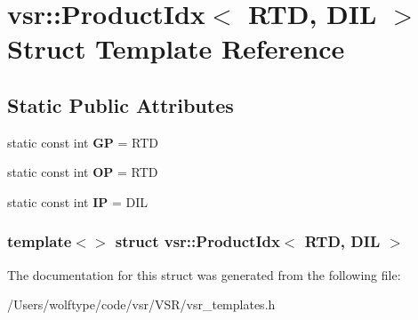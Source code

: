 \hypertarget{structvsr_1_1_product_idx_3_01_r_t_d_00_01_d_i_l_01_4}{\section{vsr\-:\-:Product\-Idx$<$ R\-T\-D, D\-I\-L $>$ Struct Template Reference}
\label{structvsr_1_1_product_idx_3_01_r_t_d_00_01_d_i_l_01_4}
}
\subsection*{Static Public Attributes}
\begin{DoxyCompactItemize}
\item 
\hypertarget{structvsr_1_1_product_idx_3_01_r_t_d_00_01_d_i_l_01_4_a542409b655d023862011da44886ac0e3}{static const int {\bfseries G\-P} = R\-T\-D}\label{structvsr_1_1_product_idx_3_01_r_t_d_00_01_d_i_l_01_4_a542409b655d023862011da44886ac0e3}

\item 
\hypertarget{structvsr_1_1_product_idx_3_01_r_t_d_00_01_d_i_l_01_4_a3cebfa214fd71a526e37d33760c337df}{static const int {\bfseries O\-P} = R\-T\-D}\label{structvsr_1_1_product_idx_3_01_r_t_d_00_01_d_i_l_01_4_a3cebfa214fd71a526e37d33760c337df}

\item 
\hypertarget{structvsr_1_1_product_idx_3_01_r_t_d_00_01_d_i_l_01_4_ac5f661411e31a63f1eec7189e852de4b}{static const int {\bfseries I\-P} = D\-I\-L}\label{structvsr_1_1_product_idx_3_01_r_t_d_00_01_d_i_l_01_4_ac5f661411e31a63f1eec7189e852de4b}

\end{DoxyCompactItemize}
\subsubsection*{template$<$$>$ struct vsr\-::\-Product\-Idx$<$ R\-T\-D, D\-I\-L $>$}



The documentation for this struct was generated from the following file\-:\begin{DoxyCompactItemize}
\item 
/\-Users/wolftype/code/vsr/\-V\-S\-R/vsr\-\_\-templates.\-h\end{DoxyCompactItemize}

